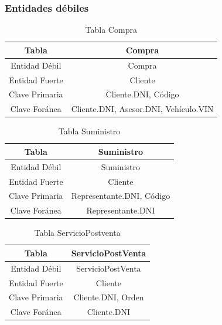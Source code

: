 \documentclass[12pt]{article}
\begin{document}
\newpage

\subsubsection{Entidades d\'ebiles}

\begin{table}[htbp]
\begin{center}
\begin{tabular}{|c|c|}
\hline
Tabla & Compra \\
\hline
Entidad Débil & Compra \\
\hline
Entidad Fuerte & Cliente \\
\hline
Clave Primaria & Cliente.DNI, Código \\
\hline
Clave Foránea & Cliente.DNI, Asesor.DNI, Vehículo.VIN \\
\hline
\end{tabular}
\caption{Tabla Compra}
\label{tab:tablas}
\end{center}
\end{table}


\begin{table}[htbp]
\begin{center}
\begin{tabular}{|c|c|}
\hline
Tabla & Suministro \\
\hline
Entidad Débil & Suministro \\
\hline
Entidad Fuerte & Cliente \\
\hline
Clave Primaria & Representante.DNI, Código \\
\hline
Clave Foránea & Representante.DNI \\
\hline
\end{tabular}
\caption{Tabla Suministro}
\label{tab:tablas}
\end{center}
\end{table}


\begin{table}[htbp]
\begin{center}
\begin{tabular}{|c|c|}
\hline
Tabla & ServicioPostVenta \\
\hline
Entidad Débil & ServicioPostVenta \\
\hline
Entidad Fuerte & Cliente \\
\hline
Clave Primaria & Cliente.DNI, Orden \\
\hline
Clave Foránea & Cliente.DNI \\
\hline
\end{tabular}
\caption{Tabla ServicioPostventa}
\label{tab:tablas}
\end{center}
\end{table}
\end{document}

